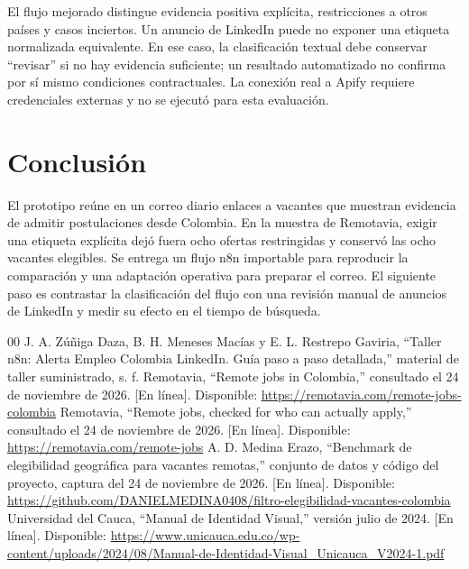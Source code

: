 \documentclass[conference]{IEEEtran}
\begin{document}
El flujo mejorado distingue evidencia positiva explícita, restricciones a otros países y casos inciertos. Un anuncio de LinkedIn puede no exponer una etiqueta normalizada equivalente. En ese caso, la clasificación textual debe conservar ``revisar'' si no hay evidencia suficiente; un resultado automatizado no confirma por sí mismo condiciones contractuales. La conexión real a Apify requiere credenciales externas y no se ejecutó para esta evaluación.

\section{Conclusión}
El prototipo reúne en un correo diario enlaces a vacantes que muestran evidencia de admitir postulaciones desde Colombia. En la muestra de Remotavia, exigir una etiqueta explícita dejó fuera ocho ofertas restringidas y conservó las ocho vacantes elegibles. Se entrega un flujo n8n importable para reproducir la comparación y una adaptación operativa para preparar el correo. El siguiente paso es contrastar la clasificación del flujo con una revisión manual de anuncios de LinkedIn y medir su efecto en el tiempo de búsqueda.

\begin{thebibliography}{00}
 J. A. Zúñiga Daza, B. H. Meneses Macías y E. L. Restrepo Gaviria, ``Taller n8n: Alerta Empleo Colombia LinkedIn. Guía paso a paso detallada,'' material de taller suministrado, s. f.
 Remotavia, ``Remote jobs in Colombia,'' consultado el 24 de noviembre de 2026. [En línea]. Disponible: \url{https://remotavia.com/remote-jobs-colombia}
 Remotavia, ``Remote jobs, checked for who can actually apply,'' consultado el 24 de noviembre de 2026. [En línea]. Disponible: \url{https://remotavia.com/remote-jobs}
 A. D. Medina Erazo, ``Benchmark de elegibilidad geográfica para vacantes remotas,'' conjunto de datos y código del proyecto, captura del 24 de noviembre de 2026. [En línea]. Disponible: \url{https://github.com/DANIELMEDINA0408/filtro-elegibilidad-vacantes-colombia}
 Universidad del Cauca, ``Manual de Identidad Visual,'' versión julio de 2024. [En línea]. Disponible: \url{https://www.unicauca.edu.co/wp-content/uploads/2024/08/Manual-de-Identidad-Visual_Unicauca_V2024-1.pdf}
\end{thebibliography}
\end{document}
